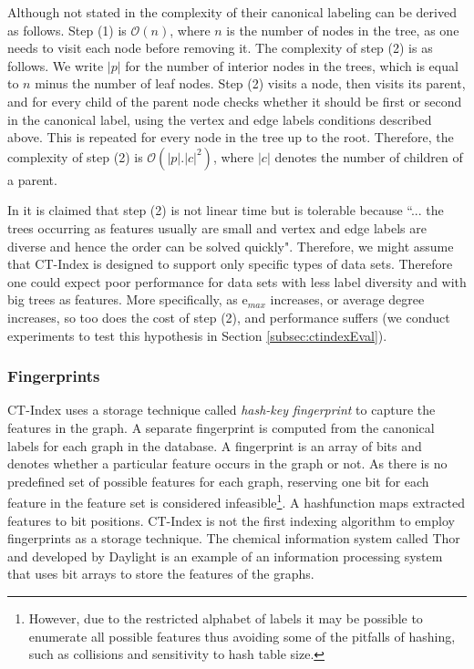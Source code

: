 \documentclass{l4proj}
\newcounter{example}[section]
\begin{document}
Although not stated in \cite{ctindex} the complexity of their canonical labeling can be derived as follows. Step (1) is $\mathcal{O}(n)$, where $n$ is the number of nodes in the tree, as one needs to visit each node before removing it. The complexity of step (2) is as follows. We write $|p|$ for the number of interior nodes in the trees, which is equal to $n$ minus the number of leaf nodes. Step (2) visits a node, then visits its parent, and for every child of the parent node checks whether it should be first or second in the canonical label, using the vertex and edge labels conditions described above. This is repeated for every node in the tree up to the root. Therefore, the complexity of step (2) is $\mathcal{O}(|p|.|c|^{2})$, where $|c|$ denotes the number of children of a parent.

In \cite{ctindex} it is claimed that step (2) is not linear time but is tolerable because ``... the trees occurring as features usually are small and vertex and edge labels are diverse and hence the order can be solved quickly". Therefore, we might assume that CT-Index is designed to support only specific types of data sets. Therefore one could expect poor performance for data sets with less label diversity and with big trees as features. More specifically, as e$_{max}$ increases, or average degree increases, so too does the cost of step (2), and performance suffers (we conduct experiments to test this hypothesis in Section \ref{subsec:ctindexEval}).

\subsubsection{Fingerprints}

CT-Index uses a storage technique called \emph{hash-key fingerprint} to capture the features in the graph. A separate fingerprint is computed from the canonical labels for each graph in the database. A fingerprint is an array of bits and denotes whether a particular feature occurs in the graph or not. As there is no predefined set of possible features for each graph, reserving one bit for each feature in the feature set is considered infeasible\footnote{However, due to the restricted alphabet of labels it may be possible to enumerate all possible features thus avoiding some of the pitfalls of hashing, such as collisions and sensitivity to hash table size.}. A \gls{hashfunction} maps extracted features to bit positions.
CT-Index is not the first indexing algorithm to employ fingerprints as a storage technique. The chemical information system called Thor and developed by Daylight \cite{fingerprints} is an example of an information processing system that uses bit arrays to store the features of the graphs.
\end{document}
